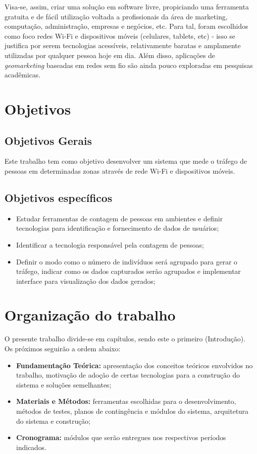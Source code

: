 Visa-se, assim, criar uma solução em software livre, propiciando uma ferramenta gratuita e de fácil utilização voltada a profissionais da área de marketing, computação, administração, empresas e negócios, etc. Para tal, foram escolhidos como foco redes Wi-Fi e dispositivos móveis (celulares, tablets, etc) - isso se justifica por serem tecnologias acessíveis, relativamente baratas e amplamente utilizadas por qualquer pessoa hoje em dia. Além disso, aplicações de \emph{geomarketing} baseadas em redes sem fio são ainda pouco exploradas em pesquisas acadêmicas.

\section{Objetivos}
\label{objetivos}

\subsection{Objetivos Gerais}
Este trabalho tem como objetivo desenvolver um sistema que mede o tráfego de
pessoas em determinadas zonas através de rede Wi-Fi e dispositivos móveis.

\subsection{Objetivos específicos}
\begin{itemize}
  \item Estudar ferramentas de contagem de pessoas em ambientes e definir tecnologias para identificação e fornecimento de dados de usuários;
  \item Identificar a tecnologia responsável pela contagem de pessoas;
  \item Definir o modo como o número de indivíduos será agrupado para gerar o tráfego, indicar como os dados capturados serão agrupados e implementar interface para visualização dos dados gerados;
\end{itemize}

\section{Organização do trabalho}
O presente trabalho divide-se em capítulos, sendo este o primeiro (Introdução). Os próximos seguirão a ordem abaixo:

\begin{itemize}
  \item \textbf{Fundamentação Teórica:} apresentação dos conceitos teóricos envolvidos no trabalho, motivação de
  adoção de certas tecnologias para a construção do sistema e soluções semelhantes;
  \item \textbf{Materiais e Métodos:} ferramentas escolhidas para o desenvolvimento, métodos de testes, planos de contingência e módulos
  do sistema, arquitetura do sistema e construção;
  \item \textbf{Cronograma:} módulos que serão entregues nos respectivos períodos indicados.
\end{itemize}
